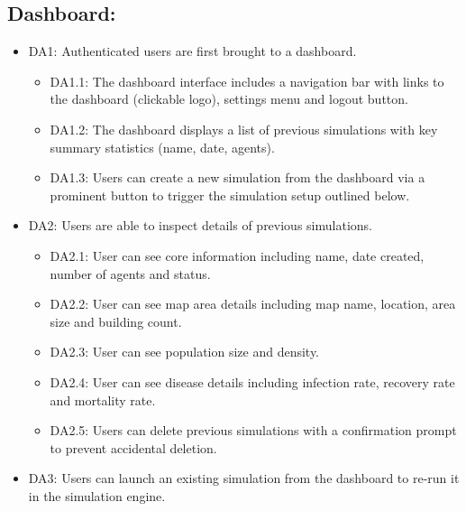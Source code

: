 \subsection{Dashboard:}
\begin{itemize}
    \item \label{req:DA1} DA1: Authenticated users are first brought to a dashboard.
    \begin{itemize}
        \item \label{req:DA1.1} DA1.1: The dashboard interface includes a navigation bar with links to the dashboard (clickable logo), settings menu and logout button.
        \item \label{req:DA1.2} DA1.2: The dashboard displays a list of previous simulations with key summary statistics (name, date, agents).
        \item \label{req:DA1.3} DA1.3: Users can create a new simulation from the dashboard via a prominent button to trigger the simulation setup outlined below.
    \end{itemize}
    \item \label{req:DA2} DA2: Users are able to inspect details of previous simulations.
    \begin{itemize}
        \item \label{req:DA2.1} DA2.1: User can see core information including name, date created, number of agents and status.
        \item \label{req:DA2.2} DA2.2: User can see map area details including map name, location, area size and building count.
        \item \label{req:DA2.3} DA2.3: User can see population size and density.
        \item \label{req:DA2.4} DA2.4: User can see disease details including infection rate, recovery rate and mortality rate.
        \item \label{req:DA2.5} DA2.5: Users can delete previous simulations with a confirmation prompt to prevent accidental deletion.
    \end{itemize}
    \item \label{req:DA3} DA3: Users can launch an existing simulation from the dashboard to re-run it in the simulation engine.
\end{itemize}

